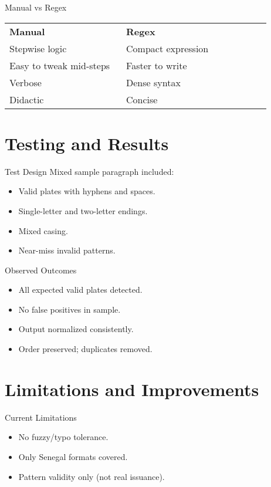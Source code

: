 \documentclass[aspectratio=169]{beamer}
\begin{document}
\begin{frame}{Manual vs Regex}
  \begin{tabular}{p{0.42\linewidth} p{0.52\linewidth}}
    \textbf{Manual} & \textbf{Regex} \\
    Stepwise logic & Compact expression \\
    Easy to tweak mid-steps & Faster to write \\
    Verbose & Dense syntax \\
    Didactic & Concise \\
  \end{tabular}
\end{frame}

\section{Testing and Results}

\begin{frame}{Test Design}
  Mixed sample paragraph included:
  \begin{itemize}
    \item Valid plates with hyphens and spaces.
    \item Single-letter and two-letter endings.
    \item Mixed casing.
    \item Near-miss invalid patterns.
  \end{itemize}
\end{frame}

\begin{frame}{Observed Outcomes}
  \begin{itemize}
    \item All expected valid plates detected.
    \item No false positives in sample.
    \item Output normalized consistently.
    \item Order preserved; duplicates removed.
  \end{itemize}
\end{frame}

\section{Limitations and Improvements}

\begin{frame}{Current Limitations}
  \begin{itemize}
    \item No fuzzy/typo tolerance.
    \item Only Senegal formats covered.
    \item Pattern validity only (not real issuance).
  \end{itemize}
\end{frame}
\end{document}
